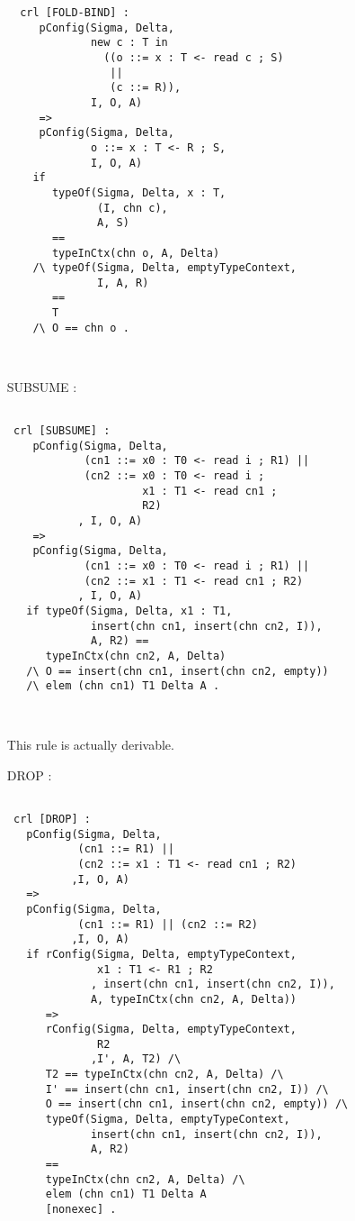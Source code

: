 \documentclass{article}
\begin{document}
\begin{itemize}
\begin{lstlisting}
  crl [FOLD-BIND] :
     pConfig(Sigma, Delta, 
             new c : T in 
               ((o ::= x : T <- read c ; S)
                ||
                (c ::= R)),
             I, O, A)
     =>
     pConfig(Sigma, Delta,
             o ::= x : T <- R ; S,
             I, O, A)
    if 
       typeOf(Sigma, Delta, x : T,
              (I, chn c), 
              A, S) 
       == 
       typeInCtx(chn o, A, Delta)             
    /\ typeOf(Sigma, Delta, emptyTypeContext,
              I, A, R)
       == 
       T          
    /\ O == chn o .
   
  
     \end{lstlisting} 
\item[SUBSUME]:
\begin{lstlisting}    
    
 crl [SUBSUME] :
    pConfig(Sigma, Delta, 
            (cn1 ::= x0 : T0 <- read i ; R1) || 
            (cn2 ::= x0 : T0 <- read i ;
                     x1 : T1 <- read cn1 ; 
                     R2) 
           , I, O, A)
    => 
    pConfig(Sigma, Delta,
            (cn1 ::= x0 : T0 <- read i ; R1) || 
            (cn2 ::= x1 : T1 <- read cn1 ; R2)  
           , I, O, A)
   if typeOf(Sigma, Delta, x1 : T1, 
             insert(chn cn1, insert(chn cn2, I)), 
             A, R2) == 
      typeInCtx(chn cn2, A, Delta) 
   /\ O == insert(chn cn1, insert(chn cn2, empty)) 
   /\ elem (chn cn1) T1 Delta A . 
   
   
     \end{lstlisting} 
  \noindent This rule is actually derivable.   
\item[DROP]:
\begin{lstlisting}  
   
 crl [DROP] : 
   pConfig(Sigma, Delta,
           (cn1 ::= R1) || 
           (cn2 ::= x1 : T1 <- read cn1 ; R2)
          ,I, O, A)
   => 
   pConfig(Sigma, Delta,
           (cn1 ::= R1) || (cn2 ::= R2)
          ,I, O, A)
   if rConfig(Sigma, Delta, emptyTypeContext, 
              x1 : T1 <- R1 ; R2
             , insert(chn cn1, insert(chn cn2, I)), 
             A, typeInCtx(chn cn2, A, Delta)) 
      => 
      rConfig(Sigma, Delta, emptyTypeContext, 
              R2
             ,I', A, T2) /\
      T2 == typeInCtx(chn cn2, A, Delta) /\    
      I' == insert(chn cn1, insert(chn cn2, I)) /\
      O == insert(chn cn1, insert(chn cn2, empty)) /\
      typeOf(Sigma, Delta, emptyTypeContext, 
             insert(chn cn1, insert(chn cn2, I)), 
             A, R2) 
      == 
      typeInCtx(chn cn2, A, Delta) /\ 
      elem (chn cn1) T1 Delta A
      [nonexec] .
      

\end{lstlisting}
\end{itemize}
\end{document}

